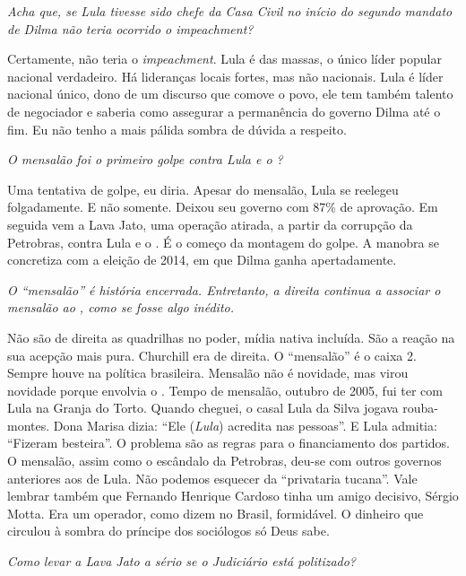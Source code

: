 \itshape
Acha que, se Lula tivesse sido chefe da Casa Civil no
início do segundo mandato de Dilma não teria ocorrido o
\emph{impeachment}?

\normalfont 
Certamente, não teria o \emph{impeachment}. Lula é das
massas, o único líder popular nacional verdadeiro. Há lideranças locais
fortes, mas não nacionais. Lula é líder nacional único, dono de um
discurso que comove o povo, ele tem também talento de negociador e
saberia como assegurar a permanência do governo Dilma até o fim. Eu não
tenho a mais pálida sombra de dúvida a respeito.

\itshape
O mensalão foi o primeiro golpe contra Lula e o ?

\normalfont 
Uma tentativa de golpe, eu diria. Apesar do mensalão,
Lula se reelegeu folgadamente. E não somente. Deixou seu governo com
87\% de aprovação. Em seguida vem a Lava Jato, uma operação atirada, a
partir da corrupção da Petrobras, contra Lula e o . É o começo da
montagem do golpe. A manobra se concretiza com a eleição de 2014, em que
Dilma ganha apertadamente.

\itshape
O ``mensalão'' é história encerrada. Entretanto, a
direita continua a associar o mensalão ao , como se fosse algo
inédito.

\normalfont 
Não são de direita as quadrilhas no poder, mídia nativa
incluída. São a reação na sua acepção mais pura. Churchill era de
direita. O ``mensalão'' é o caixa 2. Sempre houve na política
brasileira. Mensalão não é novidade, mas virou novidade porque envolvia
o . Tempo de mensalão, outubro de 2005, fui ter com Lula na Granja do
Torto. Quando cheguei, o casal Lula da Silva jogava rouba-montes. Dona
Marisa dizia: ``Ele (\emph{Lula}) acredita nas pessoas''. E Lula
admitia: ``Fizeram besteira''. O problema são as regras para o
financiamento dos partidos. O mensalão, assim como o escândalo da
Petrobras, deu-se com outros governos anteriores aos de Lula. Não
podemos esquecer da ``privataria tucana''. Vale lembrar também que
Fernando Henrique Cardoso tinha um amigo decisivo, Sérgio Motta. Era um
operador, como dizem no Brasil, formidável. O dinheiro que circulou à
sombra do príncipe dos sociólogos só Deus sabe.

\itshape
Como levar a Lava Jato a sério se o Judiciário está
politizado?


